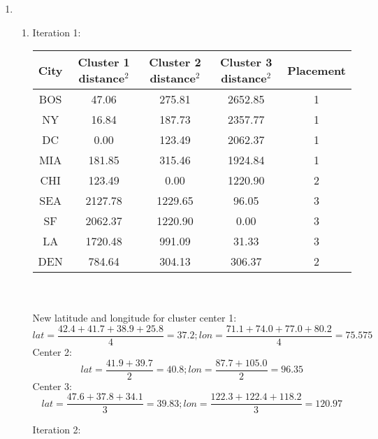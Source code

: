 \documentclass{article}
\begin{document}
\fancyhfoffset[L]{0cm}
\fancyhfoffset[R]{0cm}


\begin{enumerate}
    \setcounter{enumi}{0}
    \item
    \begin{enumerate}
        \item
            Iteration 1:\\
            \begin{tabular}{|c|c|c|c|c|}
                \hline
                \textbf{City} & \textbf{Cluster 1 distance$^2$} & \textbf{Cluster 2 distance$^2$} & \textbf{Cluster 3 distance$^2$} & \textbf{Placement} \\\hline
                BOS &   47.06 &  275.81 & 2652.85 & 1 \\\hline
                NY  &   16.84 &  187.73 & 2357.77 & 1 \\\hline
                DC  &    0.00 &  123.49 & 2062.37 & 1 \\\hline
                MIA &  181.85 &  315.46 & 1924.84 & 1 \\\hline
                CHI &  123.49 &    0.00 & 1220.90 & 2 \\\hline
                SEA & 2127.78 & 1229.65 &   96.05 & 3 \\\hline
                SF  & 2062.37 & 1220.90 &    0.00 & 3 \\\hline
                LA  & 1720.48 &  991.09 &   31.33 & 3 \\\hline
                DEN &  784.64 &  304.13 &  306.37 & 2 \\\hline
            \end{tabular}\\\\
            New latitude and longitude for cluster center 1:
            $$ lat = \frac{42.4+41.7+38.9+25.8}{4} = 37.2; lon = \frac{71.1+74.0+77.0+80.2}{4} = 75.575 $$
            Center 2:
            $$ lat = \frac{41.9+39.7}{2} = 40.8; lon = \frac{87.7 + 105.0}{2} = 96.35 $$
            Center 3:
            $$ lat = \frac{47.6 + 37.8 + 34.1}{3} = 39.83; lon = \frac{122.3 + 122.4 + 118.2}{3} = 120.97 $$

            Iteration 2:\\


\end{enumerate}
\end{enumerate}
\end{document}
